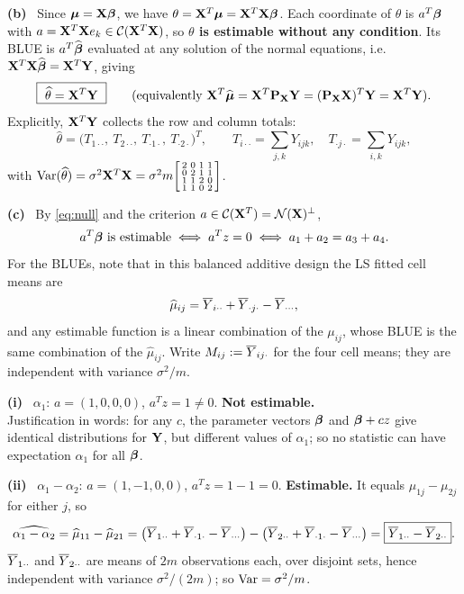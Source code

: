 \documentclass[11pt]{article}
\newcommand{\wh}[1]{\widehat{#1}}
\newcommand{\Pj}{\mathbf{P}}
\newcommand{\Nsp}{\mathcal{N}}
\newcounter{qq}[section]
\newcommand{\pt}[1]{\smallskip\noindent\textbf{(#1)}\ }
\begin{document}
\pt{b} Since $\boldsymbol{\mu}=\mathbf{X}\boldsymbol{\beta}$, we have $\theta=\mathbf{X}^T\boldsymbol{\mu}=\mathbf{X}^T\mathbf{X}\boldsymbol{\beta}$. Each coordinate of
$\theta$ is $a^T\boldsymbol{\beta}$ with $a=\mathbf{X}^T\mathbf{X} e_k\in\mathcal{C}(\mathbf{X}^T\mathbf{X})$, so
\textbf{$\theta$ is estimable without any condition}. Its BLUE is $a^T\wh\bb$ evaluated at
any solution of the normal equations, i.e.\ $\bX^T\bX\wh\bb=\bX^T\bY$, giving
\[
  \boxed{\ \wh\theta=\bX^T\bY\ }
  \qquad\text{(equivalently } \bX^T\wh\bmu=\bX^T\Pj_\bX\bY=(\Pj_\bX\bX)^T\bY=\bX^T\bY).
\]
Explicitly, $\mathbf{X}^T\mathbf{Y}$ collects the row and column totals:
\[
  \wh\theta=\big(T_{1\cdot\cdot},\ T_{2\cdot\cdot},\ T_{\cdot1\cdot},\ T_{\cdot2\cdot}\big)^T,
  \qquad
  T_{i\cdot\cdot}=\sum_{j,k}Y_{ijk},\quad T_{\cdot j\cdot}=\sum_{i,k}Y_{ijk},
\]
with $\Var(\wh\theta)=\sigma^2\bX^T\bX
=\sigma^2m\begin{bsmallmatrix}2&0&1&1\\0&2&1&1\\1&1&2&0\\1&1&0&2\end{bsmallmatrix}$.

\pt{c} By \eqref{eq:null} and the criterion $a\in\Cs(\bX^T)=\Nsp(\bX)^\perp$,
\begin{equation}\label{eq:crit}
  a^T\boldsymbol{\beta} \text{ is estimable} \iff a^Tz=0 \iff a_1+a_2=a_3+a_4 .
\end{equation}
For the BLUEs, note that in this balanced additive design the LS fitted cell means are
\[
  \wh\mu_{ij}=\Ybar_{i\cdot\cdot}+\Ybar_{\cdot j\cdot}-\Ybar_{\cdots},
\]
and any estimable function is a linear combination of the $\mu_{ij}$, whose BLUE is the same
combination of the $\wh\mu_{ij}$. Write $M_{ij}:=\overline{Y}_{ij\cdot}$ for the four cell means;
they are independent with variance $\sigma^2/m$.

\pt{i} $\alpha_1$: $a=(1,0,0,0)$, $a^Tz=1\ne0$. \textbf{Not estimable.} \\
Justification in words: for any $c$, the parameter vectors $\boldsymbol{\beta}$ and
$\boldsymbol{\beta}+cz$ give identical distributions for $\mathbf{Y}$, but different values of $\alpha_1$; so no
statistic can have expectation $\alpha_1$ for all $\boldsymbol{\beta}$.

\pt{ii} $\alpha_1-\alpha_2$: $a=(1,-1,0,0)$, $a^Tz=1-1=0$. \textbf{Estimable.}
It equals $\mu_{1j}-\mu_{2j}$ for either $j$, so
\[
  \widehat{\alpha_1-\alpha_2}=\wh\mu_{11}-\wh\mu_{21}
  =\big(\Ybar_{1\cdot\cdot}+\Ybar_{\cdot1\cdot}-\Ybar_{\cdots}\big)-\big(\Ybar_{2\cdot\cdot}+\Ybar_{\cdot1\cdot}-\Ybar_{\cdots}\big)
  =\boxed{\Ybar_{1\cdot\cdot}-\Ybar_{2\cdot\cdot}} .
\]
$\overline{Y}_{1\cdot\cdot}$ and $\overline{Y}_{2\cdot\cdot}$ are means of $2m$ observations each, over
disjoint sets, hence independent with variance $\sigma^2/(2m)$; so
$\operatorname{Var}=\sigma^2/m$.
\end{document}
